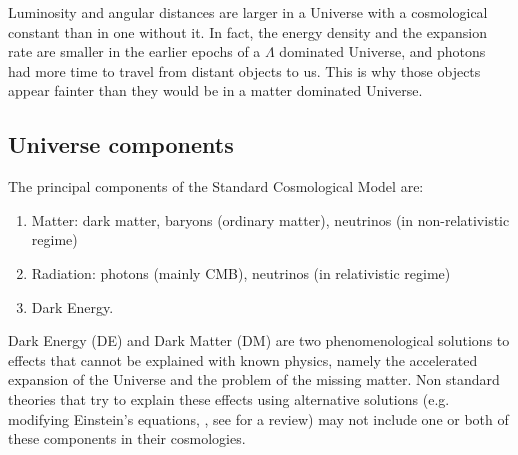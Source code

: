 

Luminosity and angular distances are larger in a Universe with a cosmological constant than in one without it. In fact, the energy density and the expansion rate are smaller in the earlier epochs of a $\Lambda$ dominated Universe, and photons had more time to travel from distant objects to us. This is why those objects appear fainter than they would be in a matter dominated Universe.


\subsection{Universe components}\label{sec:components}

The principal components of the Standard Cosmological Model are:
\begin{enumerate}
\item Matter: dark matter, baryons (ordinary matter), neutrinos (in non-relativistic regime)
\item Radiation: photons (mainly CMB), neutrinos (in relativistic regime)
\item Dark Energy.
\end{enumerate}
Dark Energy (DE) and Dark Matter (DM) are two phenomenological solutions to effects that cannot be explained with known physics, namely the accelerated expansion of the Universe and the problem of the missing matter. Non standard theories that try to explain these effects using alternative solutions (e.g. modifying Einstein's equations, \citealt{Bekenstein}, see \citealt{caldwell} for a review) may not include one or both of these components in their cosmologies.

